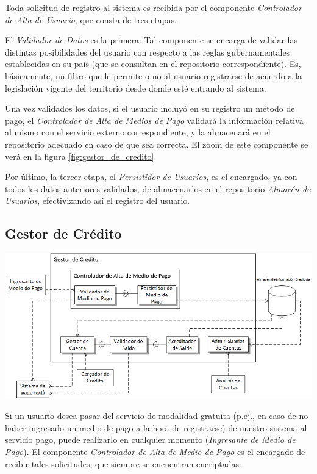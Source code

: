 Toda solicitud de registro al sistema es recibida por el componente \emph{Controlador de Alta de Usuario}, que consta de tres etapas. 

El \emph{Validador de Datos} es la primera. Tal componente se encarga de validar las distintas posibilidades del usuario con respecto a las reglas gubernamentales establecidas en su país (que se consultan en el repositorio correspondiente). Es, básicamente, un filtro que le permite o no al usuario registrarse de acuerdo a la legislación vigente del territorio desde donde esté entrando al sistema.

Una vez validados los datos, si el usuario incluyó en su registro un método de pago, el \emph{Controlador de Alta de Medios de Pago} validará la información relativa al mismo con el servicio externo correspondiente, y la almacenará en el repositorio adecuado en caso de que sea correcta. El zoom de este componente se verá en la figura \ref{fig:gestor_de_credito}.

Por último, la tercer etapa, el \emph{Persistidor de Usuarios}, es el encargado, ya con todos los datos anteriores validados, de almacenarlos en el repositorio \emph{Almacén de Usuarios}, efectivizando así el registro del usuario.

\newpage
\subsection{Gestor de Crédito}
\begin{center}
\includegraphics[scale=0.80,angle=90]{diagramas/gestor_de_credito}
\label{fig:gestor_de_credito}
\end{center}

Si un usuario desea pasar del servicio de modalidad gratuita (p.ej., en caso de no haber ingresado un medio de pago a la hora de registrarse) de nuestro sistema al servicio pago, puede realizarlo en cualquier momento (\emph{Ingresante de Medio de Pago}). El componente \emph{Controlador de Alta de Medio de Pago} es el encargado de recibir tales solicitudes, que siempre se encuentran encriptadas.

